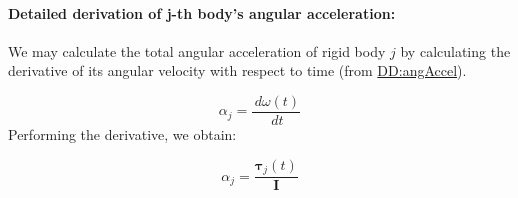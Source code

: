 \documentclass[12pt]{article}
\begin{document}
\paragraph{Detailed derivation of j-th body's angular acceleration:}
\label{IM:rotMotDeriv}
We may calculate the total angular acceleration of rigid body $j$ by calculating the derivative of its angular velocity with respect to time (from \hyperref[DD:angAccel]{DD:angAccel}).

\begin{displaymath}
{α_{j}}=\frac{\,dω\left(t\right)}{\,dt}
\end{displaymath}
Performing the derivative, we obtain:

\begin{displaymath}
{α_{j}}=\frac{{\symbf{τ}_{j}}\left(t\right)}{\symbf{I}}
\end{displaymath}
\vspace{\baselineskip}
\noindent
\end{document}
